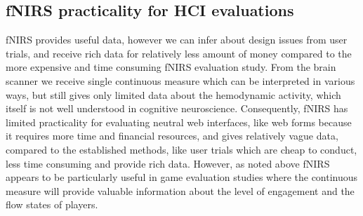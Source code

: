 \documentclass[../main/Replicate.tex]{subfiles}
\begin{document}
	\subsection{fNIRS practicality for HCI evaluations}	
	fNIRS provides useful data, however we can infer about design issues from user trials, and receive rich data for relatively less amount of money compared to the more expensive and time consuming fNIRS evaluation study. 
	From the brain scanner we receive single continuous measure which can be interpreted in various ways, but still gives only limited data about the hemodynamic activity, which itself is not well understood in cognitive neuroscience. 
	Consequently, fNIRS has limited practicality for evaluating neutral web interfaces, like web forms because it requires more time and financial resources, and gives relatively vague data, compared to the established methods, like user trials which are cheap to conduct, less time consuming and provide rich data. 
	However, as noted above fNIRS appears to be particularly useful in game evaluation studies where the continuous measure will provide valuable information about the level of engagement\cite{harrivel2013monitoring} and the flow states\cite{yoshida2014brain} of players.	
	
\end{document}
